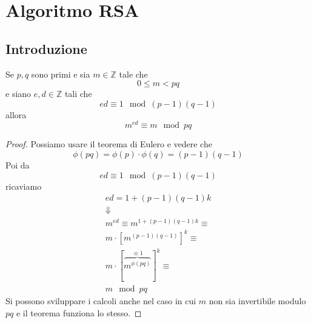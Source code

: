 \section{Algoritmo RSA}
\subsection{Introduzione}
\begin{theorem}[RSA]
	Se $p, q$ sono primi e sia $m \in \mathbb{Z}$ tale che
	\begin{equation*}
		0 \leq m < pq
	\end{equation*}
	e siano $e, d \in \mathbb{Z}$ tali che
	\begin{equation*}
		ed \equiv 1 \mod{(p - 1)(q - 1)}
	\end{equation*}
	allora
	\begin{equation*}
		m^{ed} \equiv m \mod{pq}
	\end{equation*}
	\begin{proof}
		Possiamo usare il teorema di Eulero e vedere che
		\begin{equation*}
			\phi (pq) = \phi (p) \cdot \phi(q) = (p - 1)(q - 1)
		\end{equation*}
		Poi da
		\begin{equation*}
			ed \equiv 1 \mod{(p - 1)(q - 1)}
		\end{equation*}
		ricaviamo
		\begin{equation*}
			\begin{array}{c}
				ed = 1 + (p - 1)(q - 1)k                                \\
				\Downarrow                                              \\
				m^{ed} \equiv m^{1 + (p - 1)(q - 1)k} \equiv            \\
				m \cdot [m^{(p - 1)(q - 1)}]^k \equiv                   \\
				m \cdot [\overbrace{m^{\phi (pq)}}^{\equiv 1}]^k \equiv \\
				m \mod{pq}
			\end{array}
		\end{equation*}
		Si possono sviluppare i calcoli anche nel caso in cui $m$ non sia invertibile modulo $pq$
		e il teorema funziona lo stesso.
	\end{proof}
\end{theorem}


